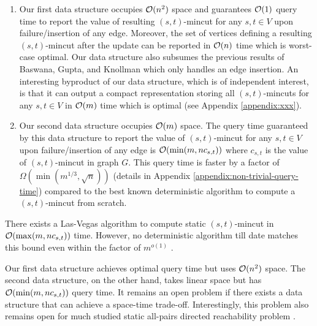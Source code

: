 \begin{enumerate}
    \item 
  Our first data structure occupies ${\cal O}(n^2)$ space and guarantees ${\cal O}(1)$ query time to report the value of resulting $(s,t)$-mincut for any $s,t \in V$ upon failure/insertion of any edge. Moreover, the set of vertices defining a resulting $(s,t)$-mincut after the update can be reported in ${\cal O}(n)$ time which is worst-case optimal. Our data structure also subsumes the previous results of Baswana, Gupta, and Knollman \cite{DBLP:conf/esa/BaswanaGK20} which only handles an edge insertion. An interesting byproduct of our data structure, which is of independent interest, is that it can output a compact representation \cite{DBLP:journals/mp/PicardQ82} storing all $(s,t)$-mincuts for any $s,t \in V$ in ${\cal O}(m)$ time which is optimal (see Appendix \ref{appendix:xxx}).

    \item
Our second data structure occupies ${\cal O}(m)$ space.
The query time guaranteed by this data structure to report the value of $(s,t)$-mincut for any $s,t\in V$ upon failure/insertion of any edge is ${\cal O}(\min(m,nc_{s,t}))$ where $c_{s,t}$ is the value of $(s,t)$-mincut in graph $G$. This query time 
is faster by a factor of $\Omega(\min(m^{1/3},\sqrt{n}))$ (details in Appendix \ref{appendix:non-trivial-query-time}) compared to the best known deterministic algorithm \cite{DBLP:conf/focs/GoldbergR97a,DBLP:conf/stoc/KargerL98,DBLP:journals/corr/abs-2003-08929} to compute a $(s,t)$-mincut from scratch.

\end{enumerate}
\begin{remark}
There exists a Las-Vegas algorithm \cite{DBLP:conf/stoc/KargerL98} to compute static $(s,t)$-mincut in ${\cal O}(\max(m,nc_{s,t}))$ time. 
However, no deterministic algorithm till date matches this bound even within the factor of $m^{o(1)}$ \cite{DBLP:conf/focs/GoldbergR97a,DBLP:conf/stoc/KargerL98,DBLP:journals/corr/abs-2003-08929}.
\end{remark}

Our first data structure achieves optimal query time but uses ${\cal O}(n^2)$ space. The second data structure, on the other hand, takes linear space but has ${\cal O}(\min(m,nc_{s,t}))$ query time. It remains an open problem if there exists a data structure that can achieve a space-time trade-off. Interestingly, this problem also remains open for much studied static all-pairs directed reachability problem  \cite{DBLP:journals/siamcomp/Patrascu11,DBLP:conf/wads/GoldsteinKLP17}.

